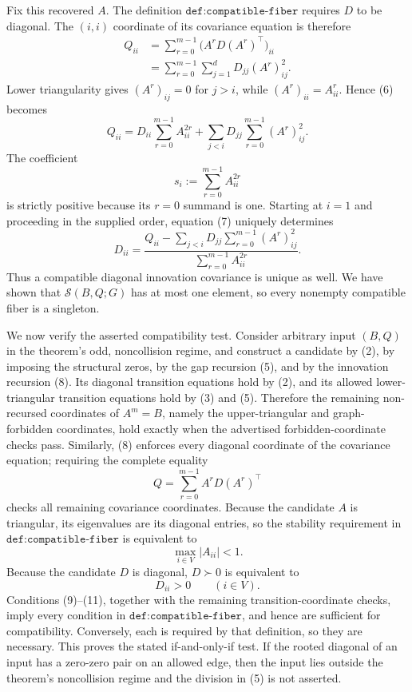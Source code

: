 Fix this recovered \(A\).  The definition \(\texttt{def:compatible-fiber}\) requires \(D\) to be diagonal.  The \((i,i)\) coordinate of its covariance equation is therefore
\[
\begin{aligned}
Q_{ii}
&=\sum_{r=0}^{m-1}\bigl(A^rD(A^r)^\top\bigr)_{ii}\\
&=\sum_{r=0}^{m-1}\sum_{j=1}^{d}D_{jj}(A^r)_{ij}^2.
\end{aligned} \tag{6}
\]
Lower triangularity gives \((A^r)_{ij}=0\) for \(j>i\), while \((A^r)_{ii}=A_{ii}^r\).  Hence (6) becomes
\[
Q_{ii}
=D_{ii}\sum_{r=0}^{m-1}A_{ii}^{2r}
+\sum_{j<i}D_{jj}\sum_{r=0}^{m-1}(A^r)_{ij}^2. \tag{7}
\]
The coefficient
\[
s_i:=\sum_{r=0}^{m-1}A_{ii}^{2r}
\]
is strictly positive because its \(r=0\) summand is one.  Starting at \(i=1\) and proceeding in the supplied order, equation (7) uniquely determines
\[
D_{ii}
=\frac{Q_{ii}-\displaystyle\sum_{j<i}D_{jj}
\displaystyle\sum_{r=0}^{m-1}(A^r)_{ij}^2}
{\displaystyle\sum_{r=0}^{m-1}A_{ii}^{2r}}. \tag{8}
\]
Thus a compatible diagonal innovation covariance is unique as well.  We have shown that \(\mathcal S(B,Q;G)\) has at most one element, so every nonempty compatible fiber is a singleton.

We now verify the asserted compatibility test.  Consider arbitrary input \((B,Q)\) in the theorem's odd, noncollision regime, and construct a candidate by (2), by imposing the structural zeros, by the gap recursion (5), and by the innovation recursion (8).  Its diagonal transition equations hold by (2), and its allowed lower-triangular transition equations hold by (3) and (5).  Therefore the remaining non-recursed coordinates of \(A^m=B\), namely the upper-triangular and graph-forbidden coordinates, hold exactly when the advertised forbidden-coordinate checks pass.  Similarly, (8) enforces every diagonal coordinate of the covariance equation; requiring the complete equality
\[
Q=\sum_{r=0}^{m-1}A^rD(A^r)^\top \tag{9}
\]
checks all remaining covariance coordinates.  Because the candidate \(A\) is triangular, its eigenvalues are its diagonal entries, so the stability requirement in \(\texttt{def:compatible-fiber}\) is equivalent to
\[
\max_{i\in V}|A_{ii}|<1. \tag{10}
\]
Because the candidate \(D\) is diagonal, \(D\succ0\) is equivalent to
\[
D_{ii}>0\qquad(i\in V). \tag{11}
\]
Conditions (9)--(11), together with the remaining transition-coordinate checks, imply every condition in \(\texttt{def:compatible-fiber}\), and hence are sufficient for compatibility.  Conversely, each is required by that definition, so they are necessary.  This proves the stated if-and-only-if test.  If the rooted diagonal of an input has a zero-zero pair on an allowed edge, then the input lies outside the theorem's noncollision regime and the division in (5) is not asserted.

